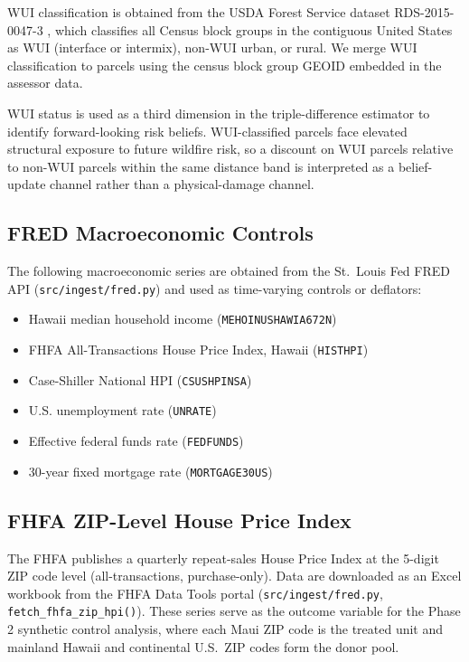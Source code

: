 \documentclass[12pt]{article}
\begin{document}
WUI classification is obtained from the USDA Forest Service dataset
RDS-2015-0047-3 \citep[Silvis Lab, University of Wisconsin--Madison]{},
which classifies all Census block groups in the contiguous United States as
WUI (interface or intermix), non-WUI urban, or rural. We merge WUI
classification to parcels using the census block group GEOID embedded in
the assessor data.

WUI status is used as a third dimension in the triple-difference estimator
to identify forward-looking risk beliefs. WUI-classified parcels face elevated
structural exposure to future wildfire risk, so a discount on WUI parcels relative
to non-WUI parcels within the same distance band is interpreted as a belief-update
channel rather than a physical-damage channel.

\subsection{FRED Macroeconomic Controls}

The following macroeconomic series are obtained from the St.\ Louis Fed FRED API
(\texttt{src/ingest/fred.py}) and used as time-varying controls or deflators:

\begin{itemize}[noitemsep]
  \item Hawaii median household income (\texttt{MEHOINUSHAWIA672N})
  \item FHFA All-Transactions House Price Index, Hawaii (\texttt{HISTHPI})
  \item Case-Shiller National HPI (\texttt{CSUSHPINSA})
  \item U.S. unemployment rate (\texttt{UNRATE})
  \item Effective federal funds rate (\texttt{FEDFUNDS})
  \item 30-year fixed mortgage rate (\texttt{MORTGAGE30US})
\end{itemize}

\subsection{FHFA ZIP-Level House Price Index}

The FHFA publishes a quarterly repeat-sales House Price Index at the 5-digit ZIP
code level (all-transactions, purchase-only). Data are downloaded as an Excel
workbook from the FHFA Data Tools portal (\texttt{src/ingest/fred.py},
\texttt{fetch\_fhfa\_zip\_hpi()}). These series serve as the outcome variable for
the Phase 2 synthetic control analysis, where each Maui ZIP code is the treated
unit and mainland Hawaii and continental U.S.\ ZIP codes form the donor pool.
\end{document}
